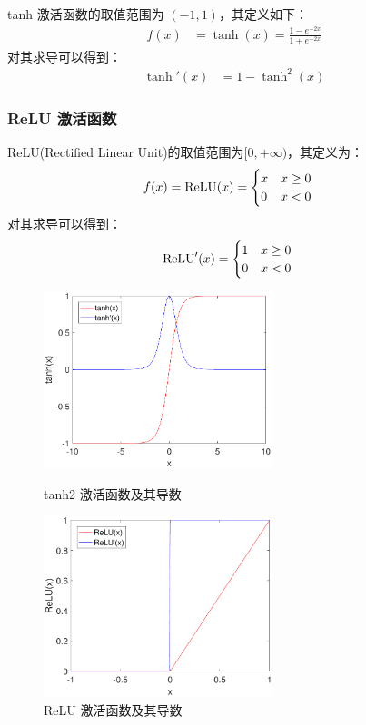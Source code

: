 tanh 激活函数的取值范围为 $(-1,1)$，其定义如下：
\begin{align}
f(x)&=\tanh(x)=\frac{1-e^{-2x}}{1+e^{-2x}}\;
\end{align}
对其求导可以得到：
\begin{align}
\tanh'(x)&=1-\tanh^2(x)\;
\end{align}


\subsubsection{ReLU 激活函数}

ReLU(Rectified Linear Unit)的取值范围为$[0,+\infty)$，其定义为：
\begin{align}
f(x)&={\rm ReLU}(x)=\begin{cases}
      x & x\geq 0 \\
      0& x<0
   \end{cases}\;
\end{align}
对其求导可以得到：
\begin{align}
{\rm ReLU}'(x)&=\begin{cases}
      1 & x\geq 0 \\
      0 & x<0
   \end{cases}\;
\end{align}


\begin{figure}[hbt]
	\centering
	\begin{minipage}{7cm}
		\includegraphics[width=6.67cm]{figures/networks/tanh2}
    \caption{tanh2 激活函数及其导数}
    \label{fig:tanh2}

	\end{minipage}
	\hspace{10pt}
	\begin{minipage}{7cm}
		\includegraphics[width=6.67cm]{figures/networks/ReLU}
    \caption{ReLU 激活函数及其导数}
    \label{fig:ReLU}

	\end{minipage}

\end{figure}



